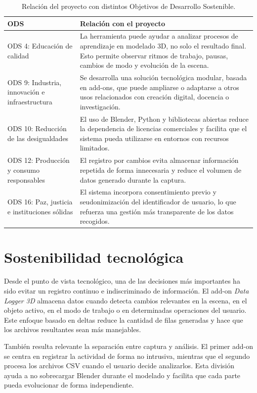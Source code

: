 \begin{table}[H]
\centering
\small
\begin{tabularx}{\textwidth}{p{2.4cm}X}
\toprule
\textbf{ODS} & \textbf{Relación con el proyecto} \\
\midrule
ODS 4: Educación de calidad & La herramienta puede ayudar a analizar procesos de aprendizaje en modelado 3D, no solo el resultado final. Esto permite observar ritmos de trabajo, pausas, cambios de modo y evolución de la escena. \\
ODS 9: Industria, innovación e infraestructura & Se desarrolla una solución tecnológica modular, basada en add-ons, que puede ampliarse o adaptarse a otros usos relacionados con creación digital, docencia o investigación. \\
ODS 10: Reducción de las desigualdades & El uso de Blender, Python y bibliotecas abiertas reduce la dependencia de licencias comerciales y facilita que el sistema pueda utilizarse en entornos con recursos limitados. \\
ODS 12: Producción y consumo responsables & El registro por cambios evita almacenar información repetida de forma innecesaria y reduce el volumen de datos generado durante la captura. \\
ODS 16: Paz, justicia e instituciones sólidas & El sistema incorpora consentimiento previo y seudonimización del identificador de usuario, lo que refuerza una gestión más transparente de los datos recogidos. \\
\bottomrule
\end{tabularx}
\caption{Relación del proyecto con distintos Objetivos de Desarrollo Sostenible.}
\label{tab:ods_relacion}
\end{table}

\section{Sostenibilidad tecnológica}

Desde el punto de vista tecnológico, una de las decisiones más importantes ha sido evitar un registro continuo e indiscriminado de información. El add-on \textit{Data Logger 3D} almacena datos cuando detecta cambios relevantes en la escena, en el objeto activo, en el modo de trabajo o en determinadas operaciones del usuario. Este enfoque basado en deltas reduce la cantidad de filas generadas y hace que los archivos resultantes sean más manejables.

También resulta relevante la separación entre captura y análisis. El primer add-on se centra en registrar la actividad de forma no intrusiva, mientras que el segundo procesa los archivos CSV cuando el usuario decide analizarlos. Esta división ayuda a no sobrecargar Blender durante el modelado y facilita que cada parte pueda evolucionar de forma independiente.


